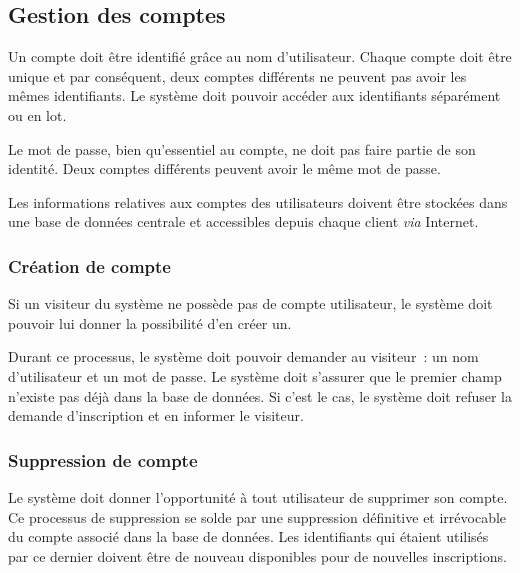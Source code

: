 \subsection{Gestion des comptes}



Un compte doit être identifié grâce au nom d'utilisateur. 
Chaque compte doit être unique et par conséquent,
deux comptes différents ne peuvent pas avoir
les mêmes identifiants. Le système doit pouvoir accéder aux
identifiants séparément ou en lot.

Le mot de passe, bien qu'essentiel au compte, ne doit pas
faire
partie de son identité. Deux comptes différents
peuvent avoir le même mot de passe.

Les informations relatives aux comptes des utilisateurs
doivent être stockées dans une base de données centrale et
accessibles depuis chaque client \emph{via} Internet.

\subsubsection{Création de compte}

Si un visiteur du système ne possède pas de compte
utilisateur, le système doit pouvoir lui donner la
possibilité d'en créer un.

Durant ce processus, le système doit pouvoir demander au
visiteur~: un nom d'utilisateur et un
mot de passe. Le système doit s'assurer que le
premier champ n'existe pas déjà dans la base de données.
Si c'est le cas, le système doit refuser la demande
d'inscription et en informer le visiteur.


\subsubsection{Suppression de compte}

Le système doit donner l'opportunité à tout utilisateur de
supprimer son compte. Ce processus de suppression se solde
par une suppression définitive et irrévocable du compte
associé dans la base de données.
Les identifiants qui étaient utilisés par ce
dernier doivent être de nouveau disponibles pour de
nouvelles inscriptions.


